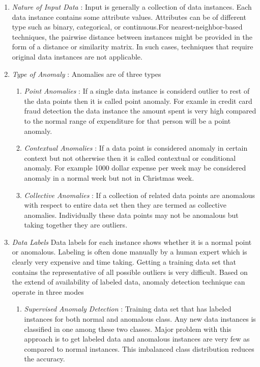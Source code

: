 \begin{enumerate}
	\item \textit{Nature of Input Data} : Input
	is generally a collection of data instances. Each data instance contains some attribute values. Attributes can be of different type such as binary, categorical, or continuous.For nearest-neighbor-based techniques, the pairwise distance between instances might be
	provided in the form of a distance or similarity matrix. In such cases, techniques that
	require original data instances are not applicable.
	
	\item \textit{Type of Anomaly} :  
	Anomalies are of three types
	\begin{enumerate}
		\item \textit{Point Anomalies} : If a single data instance is considerd outlier to rest of the data points then it is called point anomaly. For examle in credit card  fraud detection the data instance the amount spent is very high compared to the normal range of expenditure
		for that person will be a point anomaly.
		
		\item \textit{Contextual Anomalies} : If a data point is considered anomaly in certain context but not otherwise then it  is called contextual or conditional anomaly. For example 1000 dollar expense per week may be considered anomaly in a normal week but not in Christmas week.
		
		\item \textit{Collective Anomalies} : If a collection of related data points are anomalous with respect to entire data set then they are termed as collective anomalies. Individually these data points may not be anomalous but taking together they are outliers. 
	\end{enumerate}



\item \textit{Data Labels}
Data labels for each instance shows whether it is a normal point or anomalous. Labeling is often done manually by a human expert which is clearly very expensive and time taking. Getting a training data set that contains the representative of all possible outliers is very difficult. Based on the extend of availability of labeled data, anomaly detection technique can operate in three modes

\begin{enumerate}
	
	\item \textit{Supervised Anomaly Detection} : Training data set that has labeled instances for both normal and anomalous class. Any new data instances is classified in one among these two classes. Major problem with this approach is to get labeled data and anomalous instances are very few as compared to normal instances. This imbalanced class distribution reduces the accuracy. 
	

\end{enumerate}
\end{enumerate}
